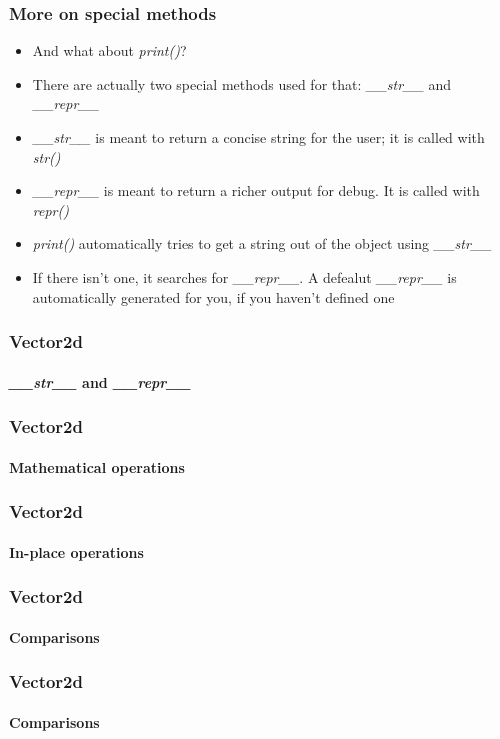 \documentclass[9pt]{beamer}
\begin{document}
\begin{frame}
  \frametitle{More on special methods}

  \begin{itemize}
    \item And what about \emph{print()}?
    \item There are actually two special methods used for that: \emph{\_\_str\_\_} and \emph{\_\_repr\_\_}
    \medskip
    \item \emph{\_\_str\_\_} is meant to return a concise string for the user; it is called with \emph{str()}
    \medskip
    \item \emph{\_\_repr\_\_} is meant to return a richer output for debug. It is called with \emph{repr()}
    \medskip
    \item \emph{print()} automatically tries to get a string out of the object using \emph{\_\_str\_\_}
    \medskip
    \item If there isn't one, it searches for \emph{\_\_repr\_\_}. A defealut \emph{\_\_repr\_\_}
          is automatically generated for you, if you haven't defined one
  \end{itemize}

\end{frame}


\begin{frame}
  \frametitle{Vector2d}
  \framesubtitle{\emph{\_\_str\_\_} and \emph{\_\_repr\_\_}}
  
\end{frame}


\begin{frame}
  \frametitle{Vector2d}
  \framesubtitle{Mathematical operations}
  
\end{frame}


\begin{frame}
  \frametitle{Vector2d}
  \framesubtitle{In-place operations}
  
\end{frame}


\begin{frame}
  \frametitle{Vector2d}
  \framesubtitle{Comparisons}
  
\end{frame}


\begin{frame}
  \frametitle{Vector2d}
  \framesubtitle{Comparisons}
  
\end{frame}
\end{document}
